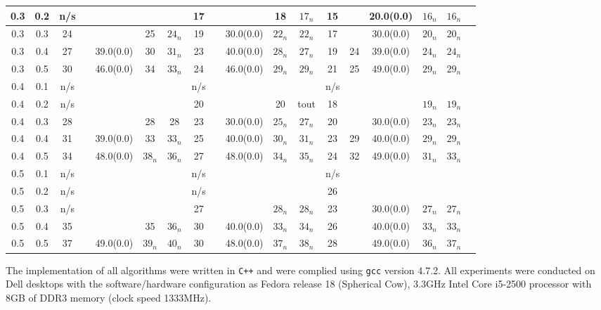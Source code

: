\documentclass[10pt]{article}
\begin{document}
\begin{table}
\begin{tabular}{|c|c|c|c|c|c|c||c|c|c|c|c||c|c|c|c|c|c|}
	\hline
	0.3&0.2&n/s&  & & &  & 17 &  && 18 &$17_n$ & 15&&20.0(0.0)&$16_n$&$16_n$\\ 
	\hline
	0.3&0.3&24&  & & 25& $24_n$ & 19 &  & 30.0(0.0) & $22_n$ & $22_n$ & 17&&30.0(0.0)&$20_n$&$20_n$\\ 
	\hline
	0.3&0.4&27&  & 39.0(0.0) & 30& $31_n$ & 23&  & 40.0(0.0) & $28_n$ & $27_n$ & 19&24&39.0(0.0)&$24_n$&$24_n$\\ 
	\hline
	0.3&0.5&30&  & 46.0(0.0) & 34& $33_n$ & 24 &  & 46.0(0.0) & $29_n$ & $29_n$ & 21&25&49.0(0.0)&$29_n$&$29_n$\\ 
	\hline
	0.4&0.1&n/s&  &  & &  & n/s&  &  &  &  & n/s&&&&\\ 
	\hline
	0.4&0.2&n/s&  &  & &  & 20 &  && 20 & tout & 18&&&$19_n$&$19_n$\\ 
	\hline
	0.4&0.3&28&  &  & 28& 28 & 23 &  &30.0(0.0)  & $25_n$ & $27_n$ & 20&&30.0(0.0)&$23_n$&$23_n$\\ 
	\hline
	0.4&0.4&31&  & 39.0(0.0) & 33& $33_n$ & 25 &  & 40.0(0.0)& $30_n$ & $31_n$ & 23&29&40.0(0.0)&$29_n$&$29_n$\\ 
	\hline
	0.4&0.5&34&  & 48.0(0.0) & $38_n$& $36_n$ & 27 &  & 48.0(0.0) & $34_n$ & $35_n$ &24&32&49.0(0.0)&$31_n$&$33_n$\\ 
	\hline
	0.5&0.1&n/s&  &  & &  & n/s &  &  &  &  & n/s&&&&\\ 
	\hline
	0.5&0.2&n/s&  &  & &  & n/s&  &  &  &  & 26&&&&\\ 
	\hline
	0.5&0.3&n/s&  &  & &  & 27 &  &  & $28_n$ &$28_n$ &23&&30.0(0.0)&$27_n$&$27_n$\\ 
	\hline
	0.5&0.4&35&  & & 35& $36_n$ & 30 &  &40.0(0.0)& $33_n$ & $34_n$ & 26&&40.0(0.0)&$33_n$&$33_n$\\ 
	\hline
	0.5&0.5&37&  & 49.0(0.0) & $39_n$& $40_n$ & 30 &  & 48.0(0.0) & $37_n$ & $38_n$ & 28&&49.0(0.0)&$36_n$&$37_n$\\ 
	\hline
  \end{tabular}
  \label{tab:random50100}
\end{table}

The implementation of all algorithms were written in \texttt{C++} and
were complied using \texttt{gcc} version 4.7.2.  All experiments were conducted
on Dell desktops with the software/hardware configuration as Fedora release 18 (Spherical Cow), 3.3GHz Intel Core i5-2500
processor with 8GB of DDR3 memory (clock speed 1333MHz).
\end{document}
